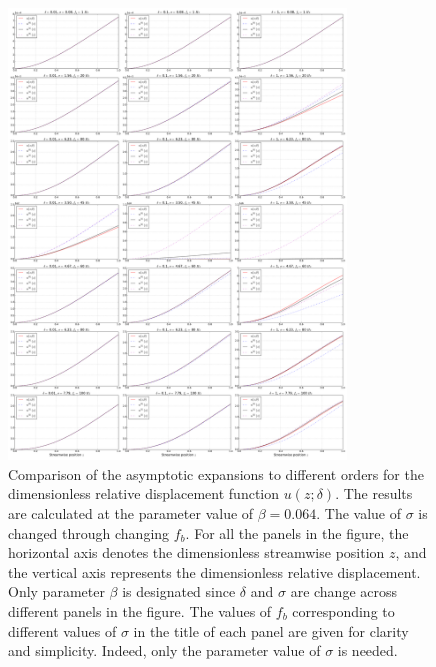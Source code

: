 \documentclass{svjour3}                     %
\begin{document}
\begin{figure}[!htbp]
    \centering
    \includegraphics[width=0.8\textwidth]{./img_eig_asy/fig_sol_analytic_disp_cmp_fr_all}
    \caption{Comparison of the asymptotic expansions to different orders for the dimensionless relative displacement function $u(z;\delta)$. The results are calculated at the parameter value of $\beta = 0.064$. The value of $\sigma$ is changed through changing $f_b$. For all the panels in the figure, the horizontal axis denotes the dimensionless streamwise position $z$, and the vertical axis represents the dimensionless relative displacement. Only parameter $\beta$ is designated since $\delta $ and $\sigma $ are change across different panels in the figure. The values of $f_b$ corresponding to different values of $\sigma$ in the title of each panel are given for clarity and simplicity. Indeed, only the parameter value of $\sigma$ is needed.}
    \label{fig:fig_sol_analytic_disp_cmp_fr_all}
\end{figure}
\end{document}
